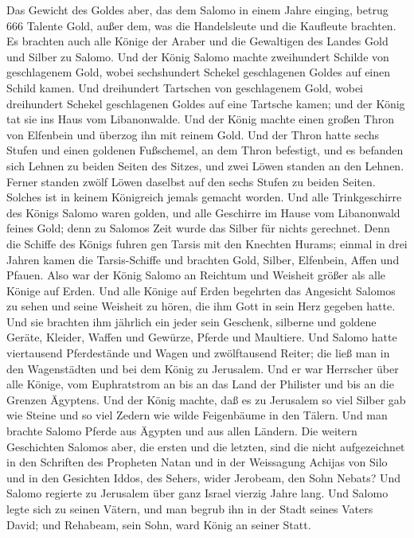  Das Gewicht des Goldes aber, das dem Salomo in einem
Jahre einging, betrug 666 Talente Gold,  außer dem, was
die Handelsleute und die Kaufleute brachten. Es brachten auch alle
Könige der Araber und die Gewaltigen des Landes Gold und Silber zu
Salomo.  Und der König Salomo machte zweihundert Schilde
von geschlagenem Gold, wobei sechshundert Schekel geschlagenen Goldes
auf einen Schild kamen.  Und dreihundert Tartschen von
geschlagenem Gold, wobei dreihundert Schekel geschlagenen Goldes auf
eine Tartsche kamen; und der König tat sie ins Haus vom Libanonwalde.
 Und der König machte einen großen Thron von Elfenbein
und überzog ihn mit reinem Gold.  Und der Thron hatte
sechs Stufen und einen goldenen Fußschemel, an dem Thron befestigt, und
es befanden sich Lehnen zu beiden Seiten des Sitzes, und zwei Löwen
standen an den Lehnen.  Ferner standen zwölf Löwen
daselbst auf den sechs Stufen zu beiden Seiten. Solches ist in keinem
Königreich jemals gemacht worden.  Und alle
Trinkgeschirre des Königs Salomo waren golden, und alle Geschirre im
Hause vom Libanonwald feines Gold; denn zu Salomos Zeit wurde das Silber
für nichts gerechnet.  Denn die Schiffe des Königs fuhren
gen Tarsis mit den Knechten Hurams; einmal in drei Jahren kamen die
Tarsis-Schiffe und brachten Gold, Silber, Elfenbein, Affen und Pfauen.
 Also war der König Salomo an Reichtum und Weisheit
größer als alle Könige auf Erden.  Und alle Könige auf
Erden begehrten das Angesicht Salomos zu sehen und seine Weisheit zu
hören, die ihm Gott in sein Herz gegeben hatte.  Und sie
brachten ihm jährlich ein jeder sein Geschenk, silberne und goldene
Geräte, Kleider, Waffen und Gewürze, Pferde und Maultiere.
 Und Salomo hatte viertausend Pferdestände und Wagen und
zwölftausend Reiter; die ließ man in den Wagenstädten und bei dem König
zu Jerusalem.  Und er war Herrscher über alle Könige, vom
Euphratstrom an bis an das Land der Philister und bis an die Grenzen
Ägyptens.  Und der König machte, daß es zu Jerusalem so
viel Silber gab wie Steine und so viel Zedern wie wilde Feigenbäume in
den Tälern.  Und man brachte Salomo Pferde aus Ägypten
und aus allen Ländern.  Die weitern Geschichten Salomos
aber, die ersten und die letzten, sind die nicht aufgezeichnet in den
Schriften des Propheten Natan und in der Weissagung Achijas von Silo und
in den Gesichten Iddos, des Sehers, wider Jerobeam, den Sohn Nebats?
 Und Salomo regierte zu Jerusalem über ganz Israel
vierzig Jahre lang.  Und Salomo legte sich zu seinen
Vätern, und man begrub ihn in der Stadt seines Vaters David; und
Rehabeam, sein Sohn, ward König an seiner Statt.

